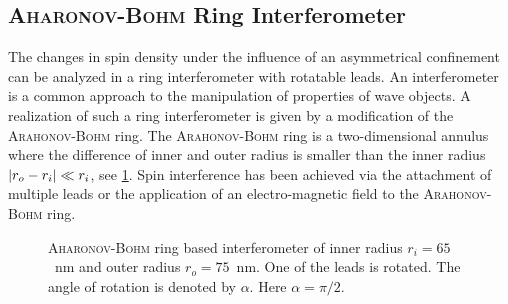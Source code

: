 \subsection{\textsc{Aharonov-Bohm} Ring Interferometer}
The changes in spin density under the influence of an asymmetrical confinement can be analyzed in a ring interferometer with rotatable leads. An interferometer is a common approach to the manipulation of properties of wave objects. A realization of such a ring interferometer is given by a modification of the \textsc{Arahonov-Bohm} ring. The \textsc{Arahonov-Bohm} ring is a two-dimensional annulus where the difference of inner and outer radius is smaller than the inner radius $\lvert r_o- r_i\rvert \ll r_i$, see \cref{fig:aharonovbohmring}.
Spin interference has been achieved via the attachment of multiple leads \cite{PhysRevB.75.035304} or the application of an electro-magnetic field \cite{PhysRevB.69.155335} to the \textsc{Arahonov-Bohm} ring.\par
\begin{figure}[!h]
  \centering
  \caption{\textsc{Aharonov-Bohm} ring based interferometer of inner radius $r_i=65$~nm and outer radius $r_o=75$~nm. One of the leads is rotated. The angle of rotation is denoted by $\alpha$. Here $\alpha=\pi/2$.}\label{fig:aharonovbohmring}
\end{figure}
